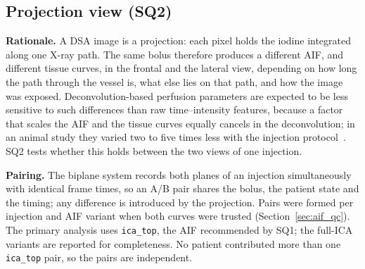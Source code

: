 %
%

\subsection{Projection view (SQ2)}
\label{sec:sq2_methods}

\textbf{Rationale.} A DSA image is a projection: each pixel holds the iodine integrated along one X-ray path.
The same bolus therefore produces a different AIF, and different tissue curves, in the frontal and the lateral
view, depending on how long the path through the vessel is, what else lies on that path, and how the image was
exposed. Deconvolution-based perfusion parameters are expected to be less sensitive to such differences than raw
time--intensity features, because a factor that scales the AIF and the tissue curves equally cancels in the
deconvolution; in an animal study they varied two to five times less with the injection
protocol~\cite{su2023animal}. SQ2 tests whether this holds between the two views of one injection.

\textbf{Pairing.} The biplane system records both planes of an injection simultaneously with identical frame
times, so an A/B pair shares the bolus, the patient state and the timing; any difference is introduced by the
projection. Pairs were formed per injection and AIF variant when both curves were trusted
(Section~\ref{sec:aif_qc}). The primary analysis uses \texttt{ica\_top}, the AIF recommended by SQ1; the
full-ICA variants are reported for completeness. No patient contributed more than one \texttt{ica\_top} pair,
so the pairs are independent.

